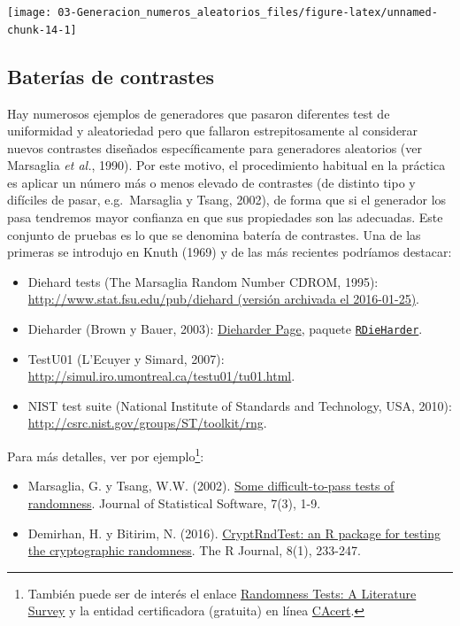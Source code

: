 \documentclass[
]{book}
\theoremstyle{break}
\theoremstyle{definition}
\theoremstyle{definition}
\theoremstyle{definition}
\theoremstyle{remark}
\begin{document}
\begin{center}\texttt{[image: 03-Generacion\_numeros\_aleatorios\_files/figure-latex/unnamed-chunk-14-1]} \end{center}

\hypertarget{baterias}{%
\subsection{Baterías de contrastes}\label{baterias}}

Hay numerosos ejemplos de generadores que pasaron diferentes test de uniformidad y aleatoriedad pero que fallaron estrepitosamente al considerar nuevos contrastes diseñados específicamente para generadores aleatorios (ver Marsaglia \emph{et al.}, 1990).
Por este motivo, el procedimiento habitual en la práctica es aplicar un número más o menos elevado de contrastes (de distinto tipo y difíciles de pasar, e.g.~Marsaglia y Tsang, 2002), de forma que si el generador los pasa tendremos mayor confianza en que sus propiedades son las adecuadas.
Este conjunto de pruebas es lo que se denomina batería de contrastes. Una de las primeras se introdujo en Knuth (1969) y de las más recientes podríamos destacar:

\begin{itemize}
\item
  Diehard tests (The Marsaglia Random Number CDROM, 1995):
  \href{https://web.archive.org/web/20160125103112/http://stat.fsu.edu/pub/diehard}{http://www.stat.fsu.edu/pub/diehard (versión archivada el 2016-01-25)}.
\item
  Dieharder (Brown y Bauer, 2003):
  \href{https://webhome.phy.duke.edu/~rgb/General/dieharder.php}{Dieharder Page},
  paquete \href{https://github.com/eddelbuettel/rdieharder}{\texttt{RDieHarder}}.
\item
  TestU01 (L'Ecuyer y Simard, 2007):
  \url{http://simul.iro.umontreal.ca/testu01/tu01.html}.
\item
  NIST test suite (National Institute of Standards and Technology, USA, 2010):
  \url{http://csrc.nist.gov/groups/ST/toolkit/rng}.
\end{itemize}

Para más detalles, ver por ejemplo\footnote{También puede ser de interés el enlace \href{http://www.ciphersbyritter.com/RES/RANDTEST.HTM}{Randomness Tests: A Literature Survey} y la entidad certificadora (gratuita) en línea \href{http://www.cacert.at/random}{CAcert}.}:

\begin{itemize}
\item
  Marsaglia, G. y Tsang, W.W. (2002). \href{http://www.jstatsoft.org/v07/i03}{Some difficult-to-pass tests of randomness}. Journal of Statistical Software, 7(3), 1-9.
\item
  Demirhan, H. y Bitirim, N. (2016). \href{https://journal.r-project.org/archive/2016/RJ-2016-016/index.html}{CryptRndTest: an R package for testing the cryptographic randomness}.
  The R Journal, 8(1), 233-247.
\end{itemize}
\end{document}
